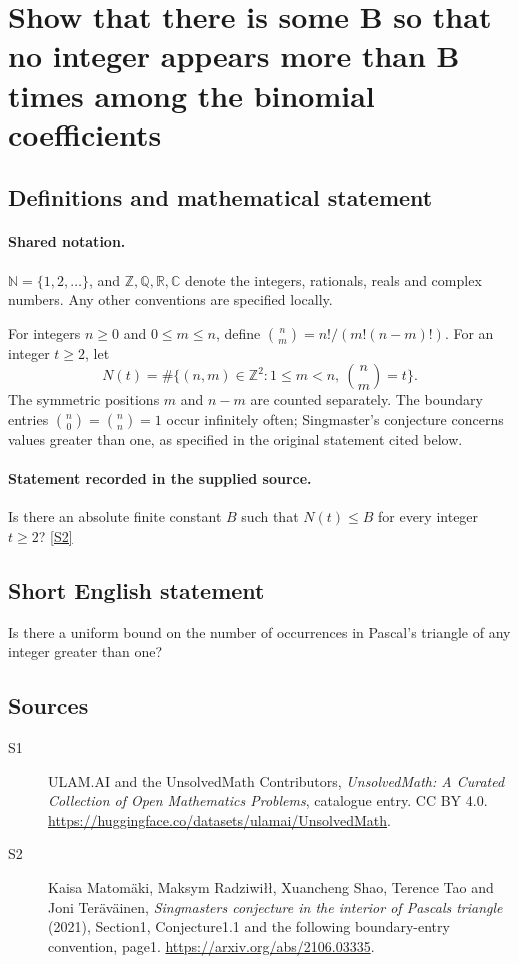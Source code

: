 \documentclass[11pt]{article}
\newcommand{\sref}[2]{\hyperlink{source:#1:#2}{[S#2]}}
\begin{document}
\section{Show that there is some B so that no integer appears more than B times among the binomial coefficients}\label{statement}

\subsection{Definitions and mathematical statement}

\paragraph{Shared notation.}$\mathbb N=\{1,2,\ldots\}$, and $\mathbb Z,\mathbb Q,\mathbb R,\mathbb C$ denote the integers, rationals, reals and complex numbers. Any other conventions are specified locally.


For integers $n\ge0$ and $0\le m\le n$, define $\binom nm=n!/(m!(n-m)!)$. For an integer $t\ge2$, let
\[N(t)=\#\{(n,m)\in\mathbb Z^2:1\le m<n,\ \binom nm=t\}.\]
The symmetric positions $m$ and $n-m$ are counted separately. The boundary entries $\binom n0=\binom nn=1$ occur infinitely often; Singmaster's conjecture concerns values greater than one, as specified in the original statement cited below.

\paragraph{Statement recorded in the supplied source.}
Is there an absolute finite constant $B$ such that $N(t)\le B$ for every integer $t\ge2$? \sref{statement}{2}

\subsection{Short English statement}
Is there a uniform bound on the number of occurrences in Pascal’s triangle of any integer greater than one?
\subsection{Sources}
\begin{description}
\item[\hypertarget{source:statement:1}{S1}] ULAM.AI and the UnsolvedMath Contributors, \emph{UnsolvedMath: A Curated Collection of Open Mathematics Problems}, catalogue entry. CC BY 4.0. \url{https://huggingface.co/datasets/ulamai/UnsolvedMath}.
\item[\hypertarget{source:statement:2}{S2}] Kaisa Matomäki, Maksym Radziwiłł, Xuancheng Shao, Terence Tao and Joni Teräväinen, \emph{Singmaster\textquotesingle s conjecture in the interior of Pascal\textquotesingle s triangle} (2021), Section1, Conjecture1.1 and the following boundary-entry convention, page1. \url{https://arxiv.org/abs/2106.03335}.
\end{description}
\label{end:statement}
\end{document}

